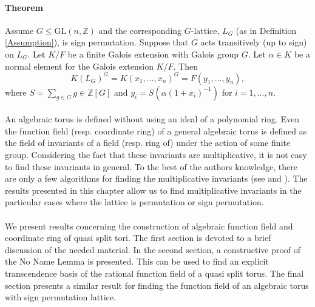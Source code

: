 \documentclass{article}
\theoremstyle{plain}
\theoremstyle{definition}
\newcommand{\Z}{\ensuremath{\mathbb{Z}}}
\begin{document}
\paragraph{Theorem}
Assume $G \leq \mathrm{GL}(n,\Z)$ and the corresponding $G$-lattice, $L_G$ (as in Definition \ref{Assumption}), is sign permutation. Suppose that $G$ acts transitively (up to sign) on $L_G$. Let $K/F$ be a finite Galois extension with Galois group $G$. Let $\alpha \in K$ be a normal element for the Galois extension $K/F$. Then 
$$K(L_G)^G = K(x_1,\ldots, x_n)^G = F(y_1, \ldots, y_{n}),$$ 
where $S = \sum_{g \in G} g \in \Z[G]$ and $y_i = S(\alpha (1+x_i)^{-1})$ for $ i = 1, \ldots, n$.
\\
\\
An algebraic torus is defined without using an ideal of a polynomial ring. Even the function field (resp. coordinate ring) of a general algebraic torus is defined as the field of invariants of a field (resp. ring of) under the action of some finite group. Considering the fact that these invariants are multiplicative, it is not easy to find these invariants in general. To the best of the authors knowledge, there are only a few algorithms for finding the multiplicative invariants (see \cite{Kemper} and \cite{Lorenz}). The results presented in this chapter allow us to find multiplicative invariants in the particular cases where the lattice is permutation or sign permutation.\\
\\
We present results concerning the construction of algebraic function field and coordinate ring of quasi split tori. The first section is devoted to a brief discussion of the needed material. In the second section, a constructive proof of the No Name Lemma is presented. This can be used to find an explicit transcendence basis of the rational function field of a quasi split torus. The final section presents a similar result for finding the function field of an algebraic torus with sign permutation lattice.
\end{document}
